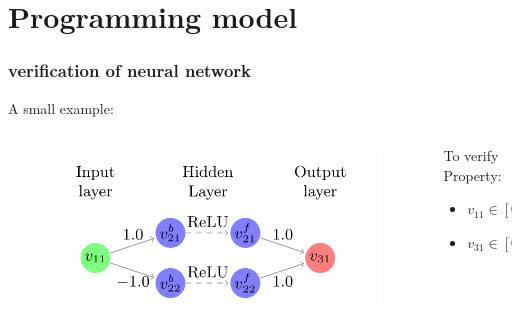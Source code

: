 \documentclass[aspectratio=169%
,serif,mathserif]{beamer}
\begin{document}
\section{Programming model}
\begin{frame}
	\frametitle{verification of neural network}
	A small example: 
	\begin{columns}
		\begin{column}{.65\textwidth}
			\begin{figure}[htbp]
				\includegraphics[width=1\linewidth]{4.png}
			\end{figure}
		\end{column}

		\begin{column}{.35\textwidth}
			To verify Property:
			\begin{itemize}
				\item $v_{11} \in [0,1] $
				\item $v_{31} \in [0.5,1] $
			\end{itemize}
		\end{column}
	\end{columns}
\end{frame}
\end{document}
